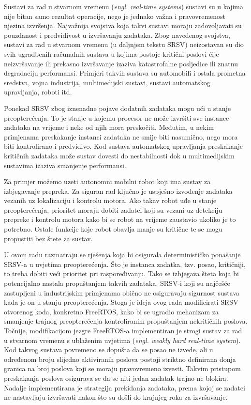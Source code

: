 \documentclass[../zavrsni.tex]{subfiles}
\begin{document}
\sloppy

\justifying



Sustavi za rad u stvarnom vremenu (\textit{engl. real-time systems}) sustavi su u kojima nije bitan samo
rezultat operacije, nego je jednako važna i pravovremenost njezina izvršenja. Najvažnija svojstva koja takvi sustavi moraju
zadovoljavati su pouzdanost i predvidivost u izvršavanju zadataka.
Zbog navedenog svojstva, sustavi za rad u stvarnom vremenu (u daljnjem tekstu SRSV) neizostavan su dio svih ugradbenih 
računalnih sustava u kojima postoje kritični poslovi čije neizvršavanje ili prekasno izvršavanje izaziva katastrofalne
posljedice ili znatnu degradaciju performansi. Primjeri takvih sustava su automobili i ostala prometna sredstva, vojna industrija, 
multimedijski sustavi, sustavi automatskog upravljanja, roboti itd. 

Ponekad SRSV zbog iznenadne pojave dodatnih zadataka mogu ući u stanje preopterećenja. To je stanje u kojemu procesor ne može 
izvršiti sve instance zadataka na vrijeme i neke od njih mora preskočiti. Međutim, u nekim primjenama preskakanje instanci zadataka ne smije biti nasumično, nego
mora biti kontrolirano i predvidivo. Kod sustava automatskog upravljanja preskakanje kritičnih zadataka može sustav dovesti do nestabilnosti dok u 
multimedijskim sustavima izaziva smanjenje performansi.
  
Za primjer možemo uzeti autonomni mobilni robot koji ima sustav za izbjegavanje prepreka. Za siguran rad ključno je uspješno izvođenje zadataka
vezanih uz lokalizaciju i kontrolu motora. Ako takav robot uđe u stanje preopterećenja, prioritet 
moraju dobiti zadatci koji su vezani uz detekciju prepreke i kontrolu motora kako bi se robot na vrijeme zaustavio ukoliko je to potrebno.
Ostale funkcije koje robot obavlja manje su kritične te se mogu propustiti bez štete za sustav.

U ovom radu razmatraju se rješenja koja bi osigurala determinističko ponašanje SRSV-a u uvjetima preopterećenja. Što je instanca zadatka, tzv. posao, kritičniji,
to treba dobiti veći prioritet pri raspoređivanju. Tako se izbjegava šteta koja bi potencijalno nastala propuštanjem takvih zadataka. 
SRSV-i koji su najčešće zastupljeni u industrijskim primjenama obično ne osiguravaju sigurnost sustava kada je on u stanju preopterećenja. Stoga je ideja ovog rada 
modificirati SRSV otvorenog koda, konkretno FreeRTOS, kako bi se ugradio mehanizam za smanjenje trajnog preopterećenja kontroliranim 
propuštanjem nekritičnih poslova. Točnije,  
modifikacijom jezgre FreeRTOS-a implementiran je strogi sustav za rad u stvarnom vremenu s ublaženim uvjetima (\textit{engl. weakly hard real-time system}). Kod takvog sustava
povremeno se dopušta da se posao ne izvede, ali u određenom broju slijedno aktiviranih poslova postoji striktno definirana donja granica na broj 
poslova koji se moraju pravovremeno izvesti.
Takvim pristupom preskakanja poslova osigurava se da se niti jedan zadatak trajno ne blokira. Nadalje implementirana je strategija 
prekidanja zadataka, prema kojoj se zadatci ne nastavljaju izvršavati nakon što su došli do krajnjeg roka za izvršavanje.
\end{document}
